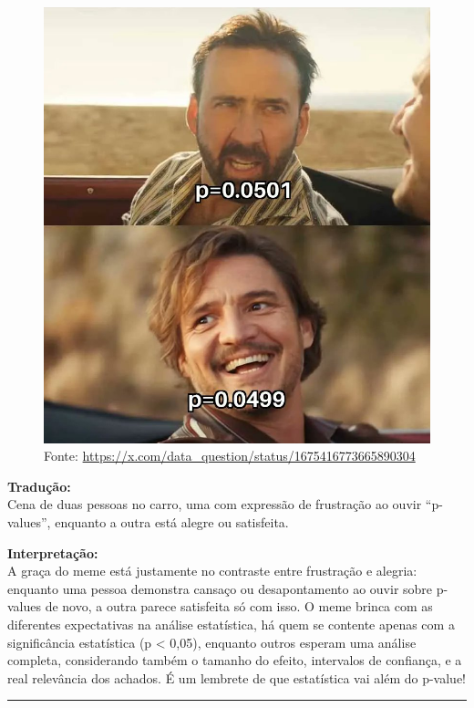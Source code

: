 \documentclass[
]{book}
\begin{document}
\begin{figure}
\centering
\includegraphics{p-value6.jpg}
\caption{Fonte: \url{https://x.com/data_question/status/1675416773665890304}}
\end{figure}

\textbf{Tradução:}\\
Cena de duas pessoas no carro, uma com expressão de frustração ao ouvir ``p-values'', enquanto a outra está alegre ou satisfeita.

\textbf{Interpretação:}\\
A graça do meme está justamente no contraste entre frustração e alegria: enquanto uma pessoa demonstra cansaço ou desapontamento ao ouvir sobre p-values de novo, a outra parece satisfeita só com isso. O meme brinca com as diferentes expectativas na análise estatística, há quem se contente apenas com a significância estatística (p \textless{} 0,05), enquanto outros esperam uma análise completa, considerando também o tamanho do efeito, intervalos de confiança, e a real relevância dos achados. É um lembrete de que estatística vai além do p-value!

\begin{center}\rule{0.5\linewidth}{0.5pt}\end{center}
\end{document}

